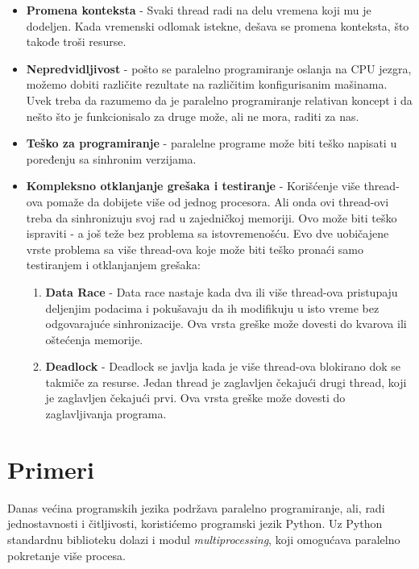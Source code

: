 \documentclass[a4paper]{article}
\begin{document}
{\begin{itemize}
\item \textbf{Promena konteksta} - Svaki thread radi na delu vremena koji mu je dodeljen. Kada vremenski odlomak istekne, dešava se promena konteksta, što takođe troši resurse.\cite{zoboko}
\item \textbf{Nepredvidljivost} - pošto se paralelno programiranje oslanja na CPU jezgra, možemo dobiti različite rezultate na različitim konfigurisanim mašinama. Uvek treba da razumemo da je paralelno programiranje relativan koncept i da nešto što je funkcionisalo za druge može, ali ne mora, raditi za nas.\cite{zoboko}
\item \textbf{Teško za programiranje} - paralelne programe može biti teško napisati u poređenju sa sinhronim verzijama.\cite{zoboko}
\item \textbf{Kompleksno otklanjanje grešaka i testiranje} - Korišćenje više thread-ova pomaže da dobijete više od jednog procesora. Ali onda ovi thread-ovi treba da sinhronizuju svoj rad u zajedničkoj memoriji. Ovo može biti teško ispraviti - a još teže bez problema sa istovremenošću\cite{zoboko}.
Evo dve uobičajene vrste problema sa više thread-ova koje može biti teško pronaći samo testiranjem i otklanjanjem grešaka:
\begin{enumerate}
\item \textbf{Data Race} - 
Data race nastaje kada dva ili više thread-ova pristupaju deljenjim podacima i pokušavaju da ih modifikuju u isto vreme bez odgovarajuće sinhronizacije. Ova vrsta greške može dovesti do kvarova ili oštećenja memorije.\cite{perforce}
\item \textbf{Deadlock} - 
Deadlock se javlja kada je više thread-ova blokirano dok se takmiče za resurse. Jedan thread je zaglavljen čekajući drugi thread, koji je zaglavljen čekajući prvi. Ova vrsta greške može dovesti do zaglavljivanja programa.\cite{perforce}
\end{enumerate}
\end{itemize}

	
	\section{Primeri}
    Danas većina programskih jezika podržava paralelno programiranje, ali, radi jednostavnosti i čitljivosti, koristićemo programski jezik Python. Uz Python standardnu biblioteku dolazi i modul \emph{multiprocessing}, koji omogućava paralelno pokretanje više procesa.
}
\end{document}

